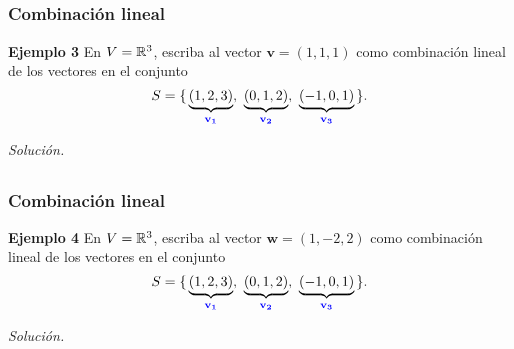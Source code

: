 
\subsection{}

\begin{frame}\frametitle{Combinación lineal}

\begin{ej}{\textbf{Ejemplo 3}} \justifying
	En $V=\mathbb{R}^3$, escriba al vector $\mathbf{v}=(1,1,1)$ como combinación lineal de los vectores en el conjunto
	\[
		S = \{ \, \underbrace{(1,2,3)}_{\color{blue}\mathbf{v_1}}, \ \underbrace{(0,1,2)}_{\color{blue}\mathbf{v_2}}, \ 
		\underbrace{(-1,0,1)}_{\color{blue}\mathbf{v_3}} \, \}.
	\]
\end{ej}	

\textit{Solución.}

\end{frame}


\subsection{}

\begin{frame}\frametitle{Combinación lineal}

\begin{ej}{\textbf{Ejemplo 4}} \justifying
	En $V=\mathbb{R}^3$, escriba al vector $\mathbf{w}=(1,-2,2)$ como combinación lineal de los vectores en el conjunto
	\[
	S = \{ \, \underbrace{(1,2,3)}_{\color{blue}\mathbf{v_1}}, \ \underbrace{(0,1,2)}_{\color{blue}\mathbf{v_2}}, \ 
	\underbrace{(-1,0,1)}_{\color{blue}\mathbf{v_3}} \, \}.
	\]
\end{ej}	

\textit{Solución.}

\end{frame}


\subsection{}


